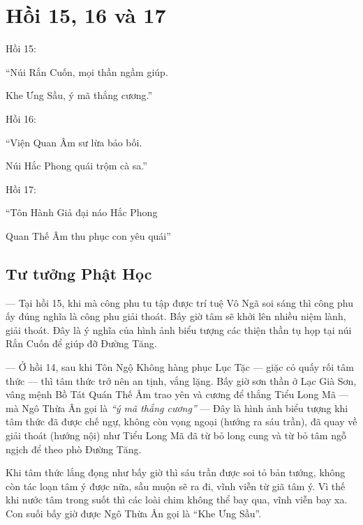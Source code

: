 \chapter{Hồi 15, 16 và 17} %
\label{cha:hoi_15_16_17}

Hồi 15:

\begin{itshape}
``Núi Rắn Cuốn, mọi thần ngầm giúp.

Khe Ưng Sầu, ý mã thắng cương.''
\end{itshape}

Hồi 16:

\begin{itshape}
``Viện Quan Âm sư lừa bảo bối.

Núi Hắc Phong quái trộm cà sa.''
\end{itshape}

Hồi 17:

\begin{itshape}
``Tôn Hành Giả đại náo Hắc Phong

Quan Thế Âm thu phục con yêu quái''
\end{itshape}

\section{Tư tưởng Phật Học} %
\label{sec:15_phat_hoc}

— Tại hồi 15, khi mà công phu tu tập được trí tuệ Vô Ngã soi sáng thì công phu ấy đúng nghĩa là công phu giải thoát. Bấy giờ tâm sẽ khởi lên nhiều niệm lành, giải thoát. Đây là ý nghĩa của hình ảnh biểu tượng các thiện thần tụ họp tại núi Rắn Cuốn để giúp đỡ Đường Tăng.

— Ở hồi 14, sau khi Tôn Ngộ Không hàng phục Lục Tặc — giặc cỏ quấy rối tâm thức — thì tâm thức trở nên an tịnh, vắng lặng. Bấy giờ sơn thần ở Lạc Già Sơn, vâng mệnh Bồ Tát Quán Thế Âm trao yên và cương để thắng Tiểu Long Mã — mà Ngô Thừa Ân gọi là \emph{``ý mã thắng cương''} — Đây là hình ảnh biểu tượng khi tâm thức đã được chế ngự, không còn vọng ngoại (hướng ra sáu trần), đã quay về giải thoát (hướng nội) như Tiểu Long Mã đã từ bỏ long cung và từ bỏ tâm ngỗ ngịch để theo phò Đường Tăng.

Khi tâm thức lắng đọng như bấy giờ thì sáu trần được soi tỏ bản tướng, không còn tác loạn tâm ý được nữa, sầu muộn sẽ ra đi, vĩnh viễn từ giã tâm ý. Vì thế khi nước tâm trong suốt thì các loài chim không thể bay qua, vĩnh viễn bay xa. Con suối bấy giờ được Ngô Thừa Ân gọi là ``Khe Ưng Sầu''.

